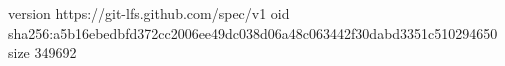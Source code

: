 version https://git-lfs.github.com/spec/v1
oid sha256:a5b16ebedbfd372cc2006ee49dc038d06a48c063442f30dabd3351c510294650
size 349692
